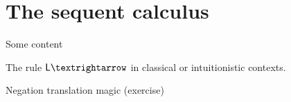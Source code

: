 \chapter{The sequent calculus}


%
Some content

\begin{convention}
	The rule \( \impL \) in classical or intuitionistic contexts.
\end{convention}

\bigskip
Negation translation magic (exercise)